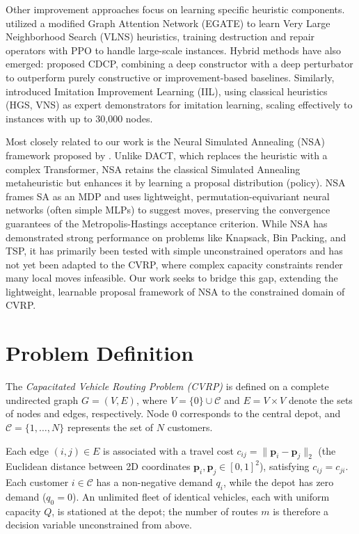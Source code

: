 \documentclass[letterpaper]{article} %
\begin{document}
Other improvement approaches focus on learning specific heuristic components. \citet{gao_learn_2020} utilized a modified Graph Attention Network (EGATE) to learn Very Large Neighborhood Search (VLNS) heuristics, training destruction and repair operators with PPO to handle large-scale instances. Hybrid methods have also emerged: \citet{garcia-torres_combining_2022} proposed CDCP, combining a deep constructor with a deep perturbator to outperform purely constructive or improvement-based baselines. Similarly, \citet{bui_imitation_2023} introduced Imitation Improvement Learning (IIL), using classical heuristics (HGS, VNS) as expert demonstrators for imitation learning, scaling effectively to instances with up to 30,000 nodes.

Most closely related to our work is the Neural Simulated Annealing (NSA) framework proposed by \citet{correia_neural_2023}. Unlike DACT, which replaces the heuristic with a complex Transformer, NSA retains the classical Simulated Annealing metaheuristic but enhances it by learning a proposal distribution (policy). NSA frames SA as an MDP and uses lightweight, permutation-equivariant neural networks (often simple MLPs) to suggest moves, preserving the convergence guarantees of the Metropolis-Hastings acceptance criterion. While NSA has demonstrated strong performance on problems like Knapsack, Bin Packing, and TSP, it has primarily been tested with simple unconstrained operators and has not yet been adapted to the CVRP, where complex capacity constraints render many local moves infeasible. Our work seeks to bridge this gap, extending the lightweight, learnable proposal framework of NSA to the constrained domain of CVRP.

\section{Problem Definition}
\label{sec:problem_definition}

The \textit{Capacitated Vehicle Routing Problem (CVRP)} is defined on a complete undirected graph $G = (V, E)$, where $V = \{0\} \cup \mathcal{C}$ and $E = V \times V$ denote the sets of nodes and edges, respectively. Node $0$ corresponds to the central depot, and $\mathcal{C} = \{1, \dots, N\}$ represents the set of $N$ customers.

Each edge $(i, j) \in E$ is associated with a travel cost $c_{ij} = \|\mathbf{p}_i - \mathbf{p}_j\|_2$ (the Euclidean distance between 2D coordinates $\mathbf{p}_i, \mathbf{p}_j \in [0,1]^2$), satisfying $c_{ij} = c_{ji}$. Each customer $i \in \mathcal{C}$ has a non-negative demand $q_i$, while the depot has zero demand ($q_0 = 0$). An unlimited fleet of identical vehicles, each with uniform capacity $Q$, is stationed at the depot; the number of routes $m$ is therefore a decision variable unconstrained from above.
\end{document}
